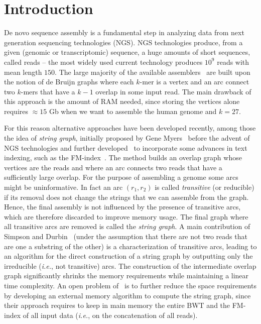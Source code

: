\documentclass[runningheads,envcountsame,a4paper]{llncs}
\newcommand{\ie}{\textit{i.e.}\xspace}
\begin{document}
\section{Introduction}
De novo sequence assembly is a fundamental step
in analyzing data from next generation sequencing technologies (NGS).
NGS technologies produce, from a given (genomic or transcriptomic) sequence, a huge amounts
of short sequences, called reads -- the most widely used current technology
produces $10^{9}$ reads with mean length $150$.
The large majority of the available
assemblers~\cite{Zerbino2008,Simpson2009,Peng2010,bankevich2012spades} are built
upon the notion of de Bruijn graphs where each $k$-mer is a vertex and an arc
connect two $k$-mers that have a $k-1$ overlap in some input read.
The main drawback of this approach is the amount of RAM needed, since storing
the vertices alone requires $\approx 15$ Gb when we want to assemble the human genome
and $k=27$.

For this reason alternative approaches have been developed recently, among those
the idea of \emph{string graph}, initially proposed by Gene Myers~\cite{Myers2005}
before the advent of NGS technologies and further
developed~\cite{Simpson2010,Simpson2012} to incorporate some advances in text
indexing, such as the FM-index~\cite{Ferragina2005}.
The method builds an overlap graph whose vertices are the reads and where an arc
connects two reads that have a sufficiently large overlap.
For the purpose of assembling a genome some arcs might be uninformative.
In fact an arc $(r_{1}, r_{2})$ is called \emph{transitive} (or reducible) if
its removal does not change the strings that we can assemble from the graph.
Hence, the final assembly is not influenced by the
presence of transitive arcs, which are therefore discarded to improve memory usage.
The final graph where all transitive arcs are removed is called the \emph{string graph}.
A main contribution of
Simpson and Durbin~\cite{Simpson2010} (under the assumption
that there are not two reads that are one a substring of the other) is a
characterization of transitive arcs, leading to an algorithm for the
direct construction of a string
graph by outputting only the irreducible (\ie, not transitive) arcs.
The construction of the intermediate overlap graph significantly shrinks
the memory requirements while maintaining a linear time complexity.
An open problem of~\cite{Simpson2010} is to further reduce
the space requirements by developing an external memory algorithm to compute the
string graph, since their approach requires to keep in main memory the entire
BWT and the FM-index of all input data (\ie, on the concatenation of all reads).
\end{document}

